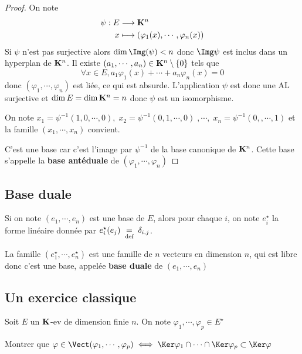 \begin{proof}
On note
\begin{align*}
    \psi : E &\longrightarrow \mathbf K^n\\
  x &\longmapsto (\varphi_1(x),\cdots,\varphi_n(x))
\end{align*}
Si $\psi$ n'est pas surjective alors $\dim \Img(\psi)<n$ donc $\Img \psi$ est inclus dans un hyperplan de $\mathbf K^n$. Il existe $(a_1,\cdots,a_n)\in \mathbf K^n\setminus \{0\}$ tels que
\[\forall x \in E, a_1 \varphi_1(x) + \cdots + a_n\varphi_n(x)=0\]
donc $(\varphi_1,\cdots,\varphi_n)$ est liée, ce qui est absurde.  L'application $\psi$ est donc une AL surjective et $\dim E= \dim \mathbf K^n=n$ donc $\psi$ est un isomorphisme.

On note $x_1=\psi^{-1}(1,0,\cdots,0),\;x_2= \psi^{-1}(0,1,\cdots,0)\;,\cdots,\;x_n= \psi^{-1}(0,,\cdots,1)$ et la famille $(x_1,\cdots,x_n)$ convient.

C'est une base car c'est l'image par $\psi^{-1}$ de la base canonique de $\mathbf K^n$. Cette base s'appelle la \textbf{base antéduale} de $(\varphi_1,\cdots,\varphi_n)$

\end{proof}

\subsection{Base duale}

Si on note $(e_1,\cdots,e_n)$ est une base de $E$, alors pour chaque $i$, on note $e_i^\star$ la forme linéaire donnée par $e_i^\star(e_j) \;\underset{\text{def}}=\; \delta_{i,j}$.

La famille $(e_1^\star, \cdots , e_n^\star)$ est une famille de $n$ vecteurs en dimension  $n$, qui est libre donc c'est une base, appelée  \textbf{base duale}  de $(e_1, \cdots , e_n)$


\subsection{Un exercice classique}

\begin{exo}
    Soit $E$ un $\mathbf K$-ev de dimension finie $n$. On note $\varphi_1,\cdots,\varphi_p \in E^\star$

Montrer que $ \varphi \in \Vect(\varphi_1,\cdots,\varphi_p)\iff \Ker \varphi_1 \cap\cdots \cap \Ker \varphi_p \subset \Ker \varphi$
\end{exo}

